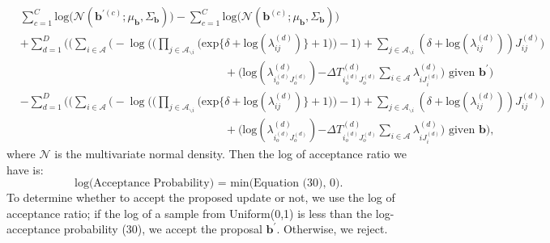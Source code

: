 \documentclass[a4paper]{article}
\begin{document}
 \begin{equation}
 \begin{aligned} 
 &\sum_{c=1}^C\mbox{log}\Big(\mathcal{N}(\boldsymbol{b}^{\prime(c)};\mu_{\boldsymbol{b}}, \Sigma_{\boldsymbol{b}})\Big)-\sum_{c=1}^C\mbox{log}\Big(\mathcal{N}(\boldsymbol{b}^{(c)};\mu_{\boldsymbol{b}}, \Sigma_{\boldsymbol{b}})\Big)\\&+ \sum_{d=1}^D\Bigg(\Big(\sum_{i\in \mathcal{A}}\Big(-\log\Big(\Big(\prod_{j \in \mathcal{A}_{\backslash i}} \Big(\mbox{exp}\{\delta+\mbox{log}(\lambda_{ij}^{(d)})\} + 1\Big)\Big)-1\Big) + \sum_{j \in \mathcal{A}_{\backslash i}} (\delta+\mbox{log}(\lambda_{ij}^{(d)}))J_{ij}^{(d)}\Big)\\&\quad\quad\quad\quad\quad\quad\quad\quad\quad\quad\quad\quad\quad\quad\quad\quad\quad\quad +  \Big(\mbox{log}(\lambda^{(d)}_{i_o^{(d)}J_o^{(d)}}){ - \Delta T^{(d)}_{i_o^{(d)}J_o^{(d)}}\sum\limits_{i \in \mathcal{A}}\lambda^{(d)}_{i{J_i^{(d)}}}} \Big)\mbox{ given }  \boldsymbol{b}^\prime\Bigg)
 \\& -\sum_{d=1}^D\Bigg(\Big(\sum_{i\in \mathcal{A}}\Big(-\log\Big(\Big(\prod_{j \in \mathcal{A}_{\backslash i}} \Big(\mbox{exp}\{\delta+\mbox{log}(\lambda_{ij}^{(d)})\} + 1\Big)\Big)-1\Big) + \sum_{j \in \mathcal{A}_{\backslash i}} (\delta+\mbox{log}(\lambda_{ij}^{(d)}))J_{ij}^{(d)}\Big)\\&\quad\quad\quad\quad\quad\quad\quad\quad\quad\quad\quad\quad\quad\quad\quad\quad\quad\quad +  \Big(\mbox{log}(\lambda^{(d)}_{i_o^{(d)}J_o^{(d)}}){ - \Delta T^{(d)}_{i_o^{(d)}J_o^{(d)}}\sum\limits_{i \in \mathcal{A}}\lambda^{(d)}_{i{J_i^{(d)}}}} \Big)\mbox{ given }  \boldsymbol{b}\Bigg),
 \end{aligned}
 \end{equation}
 where $\mathcal{N}$ is the multivariate normal density. Then the log of acceptance ratio we have is:
 \begin{equation}
 \mbox{log(Acceptance Probability) = min(Equation (30), 0). }
 \end{equation}
 To determine whether to accept the proposed update or not, we use the log of acceptance ratio; if the log of a sample from Uniform(0,1) is less than the log-acceptance probability (30), we accept the proposal $\boldsymbol{b}^\prime$. Otherwise, we reject.
\end{document}
